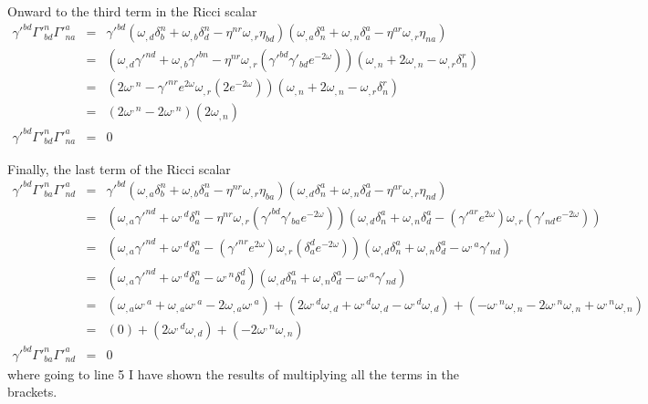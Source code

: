 \documentclass[aps,preprint,preprintnumbers,nofootinbib,showpacs,prd]{revtex4-1}
\newcommand{\nbea}{\begin{eqnarray*}}
\newcommand{\neea}{\end{eqnarray*}}
\begin{document}
Onward to the third term in the Ricci scalar
%
\nbea
\gamma'^{bd} \Gamma'^{n}_{bd}\Gamma'^{a}_{na} & = & \gamma'^{bd} \left ( \omega_{,d} \delta^n_b + \omega_{,b}\delta^n_d - \eta^{nr}\omega_{,r} \eta_{bd} \right ) \left ( \omega_{,a} \delta^a_n + \omega_{,n}\delta^a_a - \eta^{ar}\omega_{,r} \eta_{na} \right ) \\
& = & \left ( \omega_{,d}  \gamma'^{nd} + \omega_{,b} \gamma'^{bn} - \eta^{nr}\omega_{,r} (\gamma'^{bd} \gamma'_{bd} e^{-2\omega}) \right ) \left ( \omega_{,n} + 2\omega_{,n} - \omega_{,r} \delta_{n}^r \right ) \\
& = & \left ( 2 \omega^{,n} - \gamma'^{nr} e^{2\omega} \omega_{,r} (2 e^{-2\omega}) \right ) \left ( \omega_{,n} + 2\omega_{,n} - \omega_{,r} \delta_{n}^r \right ) \\
& = & \left ( 2 \omega^{,n} - 2 \omega^{,n} \right ) \left ( 2\omega_{,n} \right ) \\
\gamma'^{bd} \Gamma'^{n}_{bd}\Gamma'^{a}_{na} & = & 0
\neea
%

Finally, the last term of the Ricci scalar
%
\nbea
\gamma'^{bd} \Gamma'^{n}_{ba}\Gamma'^{a}_{nd} & = & \gamma'^{bd} \left ( \omega_{,a}\delta^n_b + \omega_{,b} \delta^n_a - \eta^{nr}\omega_{,r} \eta_{ba} \right )  \left ( \omega_{,d} \delta^a_n + \omega_{,n}\delta^a_d - \eta^{ar} \omega_{,r} \eta_{nd} \right ) \\
& = & \left ( \omega_{,a}\gamma'^{nd} + \omega^{,d} \delta^n_a - \eta^{nr}\omega_{,r} (\gamma'^{bd} \gamma'_{ba} e^{-2\omega}) \right )  \left ( \omega_{,d} \delta^a_n + \omega_{,n}\delta^a_d - (\gamma'^{ar} e^{2\omega}) \omega_{,r} (\gamma'_{nd}e^{-2\omega}) \right ) \\
& = & \left ( \omega_{,a}\gamma'^{nd} + \omega^{,d} \delta^n_a - (\gamma'^{nr} e^{2\omega})\omega_{,r} (\delta^d_{a} e^{-2\omega}) \right )  \left ( \omega_{,d} \delta^a_n + \omega_{,n}\delta^a_d - \omega^{,a} \gamma'_{nd} \right ) \\
& = & \left ( \omega_{,a}\gamma'^{nd} + \omega^{,d} \delta^n_a - \omega^{,n} \delta^d_{a} \right )  \left ( \omega_{,d} \delta^a_n + \omega_{,n}\delta^a_d - \omega^{,a} \gamma'_{nd} \right ) \\
& = & ( \omega_{,a} \omega^{,a} + \omega_{,a} \omega^{,a} - 2  \omega_{,a} \omega^{,a} ) + ( 2 \omega^{,d} \omega_{,d} + \omega^{,d} \omega_{,d} - \omega^{,d} \omega_{,d} ) + (- \omega^{,n} \omega_{,n} - 2 \omega^{,n} \omega_{,n} + \omega^{,n} \omega_{,n} ) \\
& = & (0) + ( 2\omega^{,d} \omega_{,d}) + ( -2\omega^{,n} \omega_{,n}) \\
\gamma'^{bd} \Gamma'^{n}_{ba}\Gamma'^{a}_{nd} & = & 0
\neea
%
where going to line 5 I have shown the results of multiplying all the terms in the brackets.
\end{document}
